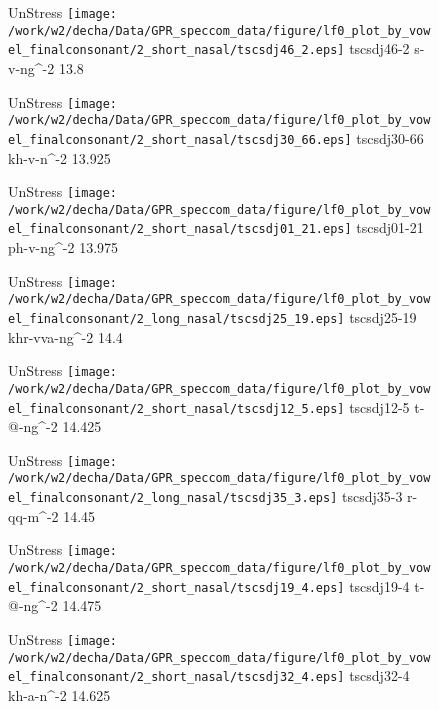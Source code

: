 \documentclass{article}
\begin{document}
\begin{figure}[t]
\begin{minipage}[b]{.24\textwidth}
UnStress
\centering
\texttt{[image: /work/w2/decha/Data/GPR\_speccom\_data/figure/lf0\_plot\_by\_vowel\_finalconsonant/2\_short\_nasal/tscsdj46\_2.eps]}
tscsdj46-2 s-v-ng\textasciicircum-2 13.8
\end{minipage}
\begin{minipage}[b]{.24\textwidth}
UnStress
\centering
\texttt{[image: /work/w2/decha/Data/GPR\_speccom\_data/figure/lf0\_plot\_by\_vowel\_finalconsonant/2\_short\_nasal/tscsdj30\_66.eps]}
tscsdj30-66 kh-v-n\textasciicircum-2 13.925
\end{minipage}
\begin{minipage}[b]{.24\textwidth}
UnStress
\centering
\texttt{[image: /work/w2/decha/Data/GPR\_speccom\_data/figure/lf0\_plot\_by\_vowel\_finalconsonant/2\_short\_nasal/tscsdj01\_21.eps]}
tscsdj01-21 ph-v-ng\textasciicircum-2 13.975
\end{minipage}
\begin{minipage}[b]{.24\textwidth}
UnStress
\centering
\texttt{[image: /work/w2/decha/Data/GPR\_speccom\_data/figure/lf0\_plot\_by\_vowel\_finalconsonant/2\_long\_nasal/tscsdj25\_19.eps]}
tscsdj25-19 khr-vva-ng\textasciicircum-2 14.4
\end{minipage}
\end{figure}
\clearpage
\begin{figure}[t]
\begin{minipage}[b]{.24\textwidth}
UnStress
\centering
\texttt{[image: /work/w2/decha/Data/GPR\_speccom\_data/figure/lf0\_plot\_by\_vowel\_finalconsonant/2\_short\_nasal/tscsdj12\_5.eps]}
tscsdj12-5 t-@-ng\textasciicircum-2 14.425
\end{minipage}
\begin{minipage}[b]{.24\textwidth}
UnStress
\centering
\texttt{[image: /work/w2/decha/Data/GPR\_speccom\_data/figure/lf0\_plot\_by\_vowel\_finalconsonant/2\_long\_nasal/tscsdj35\_3.eps]}
tscsdj35-3 r-qq-m\textasciicircum-2 14.45
\end{minipage}
\begin{minipage}[b]{.24\textwidth}
UnStress
\centering
\texttt{[image: /work/w2/decha/Data/GPR\_speccom\_data/figure/lf0\_plot\_by\_vowel\_finalconsonant/2\_short\_nasal/tscsdj19\_4.eps]}
tscsdj19-4 t-@-ng\textasciicircum-2 14.475
\end{minipage}
\begin{minipage}[b]{.24\textwidth}
UnStress
\centering
\texttt{[image: /work/w2/decha/Data/GPR\_speccom\_data/figure/lf0\_plot\_by\_vowel\_finalconsonant/2\_short\_nasal/tscsdj32\_4.eps]}
tscsdj32-4 kh-a-n\textasciicircum-2 14.625
\end{minipage}
\end{figure}
\end{document}
